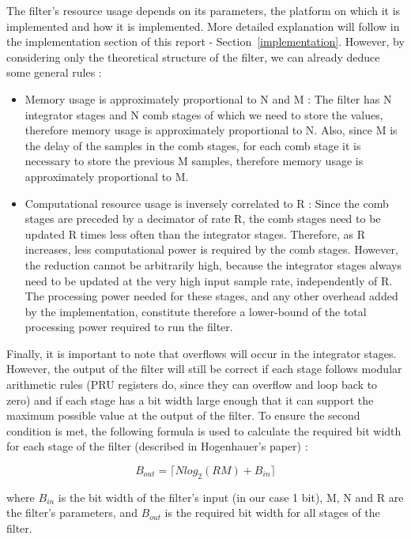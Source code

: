 \documentclass[]{report}
\providecommand{\tightlist}{%
	\setlength{\itemsep}{0pt}\setlength{\parskip}{0pt}}
\begin{document}
The filter's resource usage depends on its parameters, the platform on which it is implemented and how it is implemented. More detailed explanation will follow in the implementation section of this report - Section~\ref{implementation}. However, by considering only the theoretical structure of the filter, we can already deduce some general rules :

\begin{itemize}
\tightlist
\item
  Memory usage is approximately proportional to N and M : The filter has N integrator stages and N comb stages of which we need to store the values, therefore memory usage is approximately proportional to N. Also, since M is the delay of the samples in the comb stages, for each comb stage it is necessary to store the previous M samples, therefore memory usage is approximately proportional to M.
\item
  Computational resource usage is inversely correlated to R : Since the comb stages are preceded by a decimator of rate R, the comb stages need to be updated R times less often than the integrator stages. Therefore, as R increases, less computational power is required by the comb stages. However, the reduction cannot be arbitrarily high, because the integrator stages always need to be updated at the very high input sample rate, independently of R. The processing power needed for these stages, and any other overhead added by the implementation, constitute therefore a lower-bound of the total processing power required to run the filter.
\end{itemize}

Finally, it is important to note that overflows will occur in the integrator stages. However, the output of the filter will still be correct if each stage follows modular arithmetic rules (PRU registers do, since they can overflow and loop back to zero) and if each stage has a bit width large enough that it can support the maximum possible value at the output of the filter. To ensure the second condition is met, the following formula is used to calculate the required bit width for each stage of the filter (described in Hogenhauer's paper) :

\begin{equation}
\label{eq:bout}
B_{out} = \lceil Nlog_2(RM) + B_{in} \rceil
\end{equation}

\noindent where \(B_{in}\) is the bit width of the filter's input (in our case 1
bit), M, N and R are the filter's parameters, and \(B_{out}\) is the
required bit width for all stages of the filter.
\end{document}
